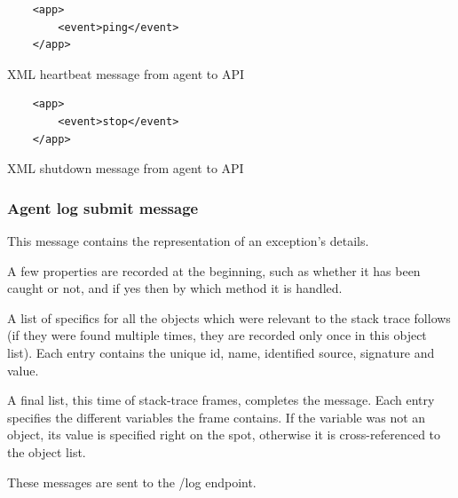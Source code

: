 \begin{listing}[H]
\begin{verbatim}
    <app>
        <event>ping</event>
    </app>
\end{verbatim}
\caption{XML heartbeat message from agent to API}
\end{listing}



\begin{listing}[H]
\begin{verbatim}
    <app>
        <event>stop</event>
    </app>
\end{verbatim}
\caption{XML shutdown message from agent to API}
\end{listing}


\subsubsection{Agent log submit message}
This message contains the representation of an exception's details.

A few properties are recorded at the beginning, such as whether it has been caught or not, and if yes then by which method it is handled.  

A list of specifics for all the objects which were relevant to the stack trace follows (if they were found multiple times, they are recorded only once in this object list). Each entry contains the unique id, name, identified source, signature and value.

A final list, this time of stack-trace frames, completes the message. Each entry specifies the different variables the frame contains. If the variable was not an object, its value is specified right on the spot, otherwise it is cross-referenced to the object list.

These messages are sent to the /log endpoint.

